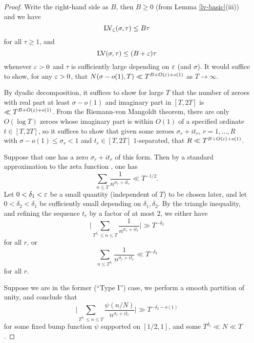 \begin{proof}
Write the right-hand side as $B$, then $B \geq 0$ (from Lemma \ref{lv-basic}(iii)) and we have
\begin{equation}\label{lvz-bound}
    \mathrm{LV}_\zeta(\sigma,\tau) \leq B \tau
\end{equation}
for all $\tau \geq 1$, and
\begin{equation}\label{lv-bound}
    \mathrm{LV}(\sigma,\tau) \leq (B+\varepsilon) \tau
\end{equation}
whenever $\varepsilon>0$ and $\tau$ is sufficiently large depending on $\varepsilon$ (and $\sigma$).  It would suffice to show, for any $\varepsilon>0$, that $N(\sigma-o(1),T) \ll T^{B+O(\varepsilon)+o(1)}$ as $T \to \infty$.

By dyadic decomposition, it suffices to show for large $T$ that the number of zeroes with real part at least $\sigma-o(1)$ and imaginary part in  $[T,2T]$ is $\ll T^{B+O(\varepsilon)+o(1)}$.  From the Riemann-von Mangoldt theorem, there are only $O(\log T)$ zeroes whose imaginary part is within $O(1)$ of a specified ordinate $t \in [T,2T]$, so it suffices to show that given some zeroes $\sigma_r + i t_r$, $r=1,\dots,R$ with $\sigma-o(1) \leq \sigma_r < 1$ and $t_r \in [T,2T]$ $1$-separated, that $R \ll T^{B+O(\varepsilon)+o(1)}$.

Suppose that one has a zero $\sigma_r+i t_r$ of this form.  Then by a standard approximation to the zeta function \cite[Theorem 1.8]{ivic}, one has
$$ \sum_{n \leq T} \frac{1}{n^{\sigma_r+it_r}} \ll T^{-1/2}.$$
Let $0 < \delta_1 < \varepsilon$ be a small quantity (independent of $T$) to be chosen later, and let $0 < \delta_2 < \delta_1$ be sufficiently small depending on $\delta_1,\delta_2$.  By the triangle inequality, and refining the sequence $t_r$ by a factor of at most $2$, we either have
$$ \bigg|\sum_{T^{\delta_1} \leq n \leq T} \frac{1}{n^{\sigma_r+it_r}} \bigg| \gg T^{-\delta_2}$$
for all $r$, or
\begin{equation}\label{td}
 \sum_{n \leq T^{\delta_1}} \frac{1}{n^{\sigma_r+it_r}} \ll T^{-\delta_2}
\end{equation}
for all $r$.

Suppose we are in the former (``Type I'') case, we perform a smooth partition of unity, and conclude that
$$ \bigg|\sum_{T^{\delta_1} \leq n \leq T} \frac{\psi(n/N)}{n^{\sigma_r+it_r}} \bigg| \gg T^{-\delta_2 - o(1)}$$
for some fixed bump function $\psi$ supported on $[1/2,1]$, and some $T^{\delta_1} \ll N \ll T$.


\end{proof}
